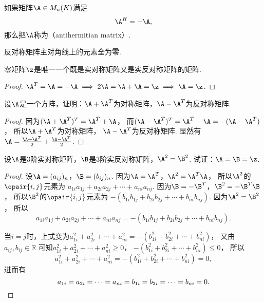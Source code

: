 \begin{definition}
如果矩阵\(\A \in M_n(K)\)满足\[
	\A^H = -\A,
\]
那么把\(\A\)称为（antihermitian matrix）.
\end{definition}

\begin{property}
反对称矩阵主对角线上的元素全为零.
\end{property}

\begin{example}
零矩阵\(\z\)是唯一一个既是实对称矩阵又是实反对称矩阵的矩阵.
\begin{proof}
\(\A^T = \A = -\A \implies 2\A = \A+\A = \z \implies \A = \z\).
\end{proof}
\end{example}

\begin{example}
设\(\A\)是一个方阵，证明：\(\A+\A^T\)为对称矩阵，\(\A-\A^T\)为反对称矩阵.
\begin{proof}
因为\((\A+\A^T)^T = \A^T+\A\)，
而\((\A-\A^T)^T = \A^T - \A = -(\A-\A^T)\)，
所以\(\A+\A^T\)为对称矩阵，
\(\A-\A^T\)为反对称矩阵.
显然有\(\A = \frac{\A + \A^T}{2} + \frac{\A - \A^T}{2}\).
\end{proof}
\end{example}

\begin{example}
设\(\A\)是3阶实对称矩阵，\(\B\)是3阶实反对称矩阵，\(\A^2 = \B^2\).
试证：\(\A = \B = \z\).
\begin{proof}
设\(\A = (a_{ij})_n\)，\(\B = (b_{ij})_n\).
因为\(\A = \A^T\)，\(\A^2 = \A^T \A\)，
所以\(\A^2\)的\(\opair{i,j}\)元素为
\(a_{1i} a_{1j} + a_{2i} a_{2j} + \dotsb + a_{ni} a_{nj}\).
因为\(\B = -\B^T\)，\(\B^2 = -\B^T \B\)，
所以\(\B^2\)的\(\opair{i,j}\)元素为
\(-(b_{1i} b_{1j} + b_{2i} b_{2j} + \dotsb + b_{ni} b_{nj})\).
因为\(\A^2 = \B^2\)，
所以\[
	a_{1i} a_{1j} + a_{2i} a_{2j} + \dotsb + a_{ni} a_{nj}
	= -(b_{1i} b_{1j} + b_{2i} b_{2j} + \dotsb + b_{ni} b_{nj}).
\]

当\(i=j\)时，上式变为\(a_{1i}^2 + a_{2i}^2 + \dotsb + a_{ni}^2
= -(b_{1i}^2 + b_{2i}^2 + \dotsb + b_{ni}^2)\)，
又由\(a_{ij},b_{ij} \in \mathbb{R}\)
可知\(a_{1i}^2 + a_{2i}^2 + \dotsb + a_{ni}^2 \geq 0\)，
\(-(b_{1i}^2 + b_{2i}^2 + \dotsb + b_{ni}^2) \leq 0\)，
所以\[
	a_{1i}^2 + a_{2i}^2 + \dotsb + a_{ni}^2
	= -(b_{1i}^2 + b_{2i}^2 + \dotsb + b_{ni}^2) = 0,
\]
进而有\[
	a_{1i} = a_{2i} = \dotsb = a_{ni} = b_{1i} = b_{2i} = \dotsb = b_{ni} = 0.
	\qedhere
\]
\end{proof}
\end{example}

